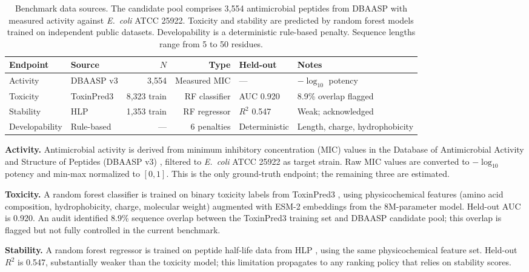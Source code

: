 \begin{table}[t]
\centering
\caption{Benchmark data sources. The candidate pool comprises 3{,}554 antimicrobial peptides from DBAASP with measured activity against \emph{E.~coli} ATCC 25922. Toxicity and stability are predicted by random forest models trained on independent public datasets. Developability is a deterministic rule-based penalty. Sequence lengths range from 5 to 50 residues.}
\label{tab:datasets}
\small
\begin{tabular}{@{}llrrll@{}}
\toprule
\textbf{Endpoint} & \textbf{Source} & \textbf{$N$} & \textbf{Type} & \textbf{Held-out} & \textbf{Notes} \\
\midrule
Activity & DBAASP v3 & 3{,}554 & Measured MIC & --- & $-\log_{10}$ potency \\
Toxicity & ToxinPred3 & 8{,}323 train & RF classifier & AUC 0.920 & 8.9\% overlap flagged \\
Stability & HLP & 1{,}353 train & RF regressor & $R^2$ 0.547 & Weak; acknowledged \\
Developability & Rule-based & --- & 6 penalties & Deterministic & Length, charge, hydrophobicity \\
\bottomrule
\end{tabular}
\end{table}

\textbf{Activity.}
Antimicrobial activity is derived from minimum inhibitory concentration (MIC) values in the Database of Antimicrobial Activity and Structure of Peptides (DBAASP v3) \citep{pirtskhalava2021dbaasp}, filtered to \emph{E.~coli} ATCC 25922 as target strain.
Raw MIC values are converted to $-\log_{10}$ potency and min-max normalized to $[0, 1]$.
This is the only ground-truth endpoint; the remaining three are estimated.

\textbf{Toxicity.}
A random forest classifier is trained on binary toxicity labels from ToxinPred3 \citep{rathore2024toxinpred3}, using physicochemical features (amino acid composition, hydrophobicity, charge, molecular weight) augmented with ESM-2 embeddings \citep{lin2023esm2} from the 8M-parameter model.
Held-out AUC is 0.920.
An audit identified 8.9\% sequence overlap between the ToxinPred3 training set and DBAASP candidate pool; this overlap is flagged but not fully controlled in the current benchmark.

\textbf{Stability.}
A random forest regressor is trained on peptide half-life data from HLP \citep{sharma2014hlp}, using the same physicochemical feature set.
Held-out $R^2$ is 0.547, substantially weaker than the toxicity model; this limitation propagates to any ranking policy that relies on stability scores.

